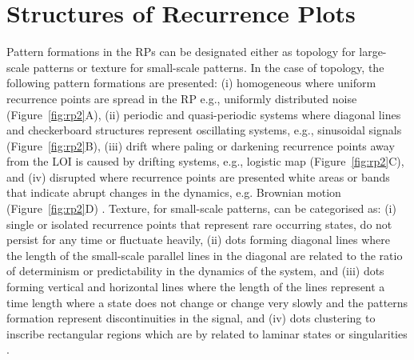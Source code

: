 \section{Structures of Recurrence Plots}

Pattern formations in the RPs can be designated either 
as topology for large-scale patterns or texture for small-scale patterns.
In the case of topology, the following pattern formations are presented:
(i) homogeneous where uniform recurrence points are spread in the RP e.g., 
uniformly distributed noise (Figure~\ref{fig:rp2}A), 
(ii) periodic and quasi-periodic systems where diagonal lines and 
checkerboard structures represent oscillating systems, e.g., sinusoidal signals (Figure~\ref{fig:rp2}B), 
(iii) drift where paling or darkening recurrence points away from 
the LOI is caused by drifting systems, 
e.g., logistic map (Figure~\ref{fig:rp2}C), and
(iv) disrupted where recurrence points are presented white areas or 
bands that indicate abrupt changes in the dynamics, e.g. Brownian motion (Figure~\ref{fig:rp2}D) 
\cite{eckmann1987, marwan2015}.
Texture, for small-scale patterns, can be categorised as:
(i) single or isolated recurrence points that represent rare occurring states, 
do not persist for any time or fluctuate heavily,
(ii) dots forming diagonal lines where the length of the small-scale parallel lines in the diagonal 
are related to the ratio of determinism or predictability in the dynamics of the system, and
(iii) dots forming vertical and horizontal lines where the length of the lines represent 
a time length where a state does not change or change very slowly and the patterns formation 
represent discontinuities in the signal, and
(iv) dots clustering to inscribe rectangular regions which are by related to laminar 
states or singularities \cite{marwan2015}.

